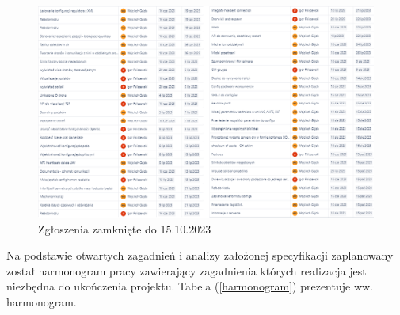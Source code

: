 \documentclass[15pt]{sprawozdanie}
\begin{document}
\begin{figure}[!h]
\centering
\includegraphics[width=\textwidth]{jira_june_sept.png}
\caption{Zgłoszenia zamknięte do 15.10.2023}
\label{zamkniete_jira}
\end{figure}

Na podstawie otwartych zagadnień i analizy założonej specyfikacji zaplanowany został harmonogram pracy zawierający zagadnienia których realizacja jest niezbędna do ukończenia projektu. Tabela (\ref{harmonogram}) prezentuje ww. harmonogram. 
\end{document}
